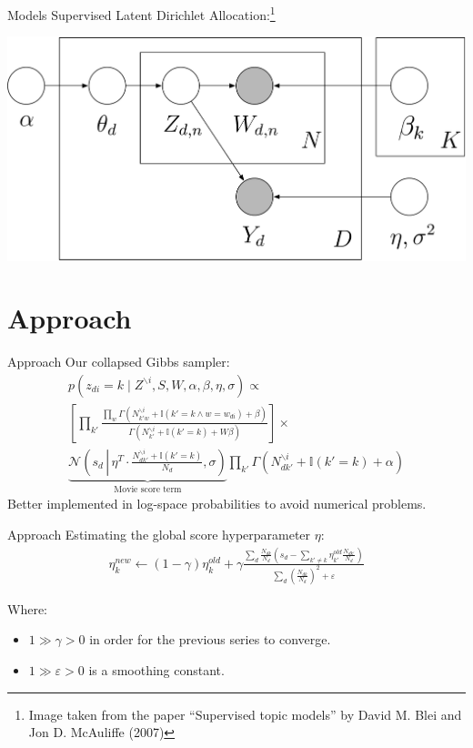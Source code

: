 \documentclass{beamer}
\begin{document}
\begin{frame}{Models}
	Supervised Latent Dirichlet Allocation:\footnote{\tiny{}Image taken from the paper ``Supervised topic models'' by David M. Blei and Jon D. McAuliffe (2007)}

	\includegraphics[width=\textwidth]{SLDA.png}
\end{frame}

\section{Approach}

\begin{frame}{Approach}
	Our collapsed Gibbs sampler:
	\begin{multline*}
	p(z_{di} = k \mid Z^{\backslash i}, S, W, \alpha, \beta, \eta, \sigma) \propto \\
	\left[ \prod_{k'} \frac{\prod_w \Gamma(N_{{k'}w}^{\backslash i} + \mathbb{I}(k' = k \wedge w = w_{di}) + \beta)}{\Gamma(N_{k'}^{\backslash i} + \mathbb{I}(k' = k) + W \beta)} \right] \times \\
	\underbrace{\mathcal{N}\left(s_d\, \left|\, \eta^T \cdot \frac{N_{d{k'}}^{\backslash i} + \mathbb{I}(k' = k)}{N_d}, \sigma\right. \right)}_\text{Movie score term} \prod_{k'} \Gamma(N_{d{k'}}^{\backslash i} + \mathbb{I}(k' = k) + \alpha)
	\end{multline*}
	Better implemented in log-space probabilities to avoid numerical problems.
\end{frame}

\begin{frame}{Approach}
	Estimating the global score hyperparameter $\eta$:
	\begin{multline*}
	\eta_k^{new} \leftarrow (1 - \gamma) \eta_k^{old} + \gamma \frac{\sum_d \frac{N_{dk}}{N_d} \left( s_d - \sum_{k' \ne k} \eta_{k'}^{old} \frac{N_{dk'}}{N_d} \right)}{\sum_d \left( \frac{N_{dk}}{N_d}  \right)^2 + \varepsilon}
	\end{multline*}
	
	Where:
	\begin{itemize}
	\item $1 \gg \gamma > 0$ in order for the previous series to converge.
	\item $1 \gg \varepsilon > 0$ is a smoothing constant.
	\end{itemize}
\end{frame}
\end{document}
